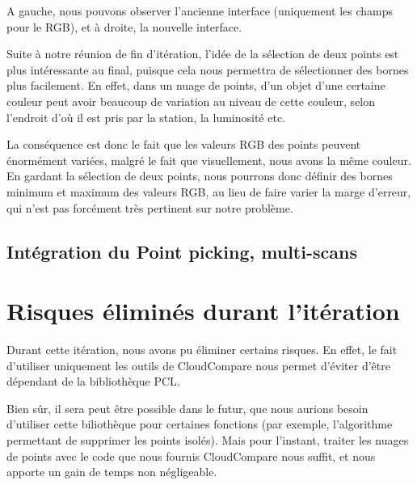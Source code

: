 \documentclass[12pt,titlepage,french]{article}
\begin{document}
A gauche, nous pouvons observer l'ancienne interface (uniquement les champs pour le RGB), et à droite, la nouvelle interface. \newline

Suite à notre réunion de fin d'itération, l'idée de la sélection de deux points est plus intéressante au final, puisque cela nous permettra de sélectionner des bornes plus facilement. En effet, dans un nuage de points, d'un objet d'une certaine couleur peut avoir beaucoup de variation au niveau de cette couleur, selon l'endroit d'où il est pris par la station, la luminosité etc. \newline

La conséquence est donc le fait que les valeurs RGB des points peuvent énormément variées, malgré le fait que visuellement, nous avons la même couleur. En gardant la sélection de deux points, nous pourrons donc définir des bornes minimum et maximum des valeurs RGB, au lieu de faire varier la marge d'erreur, qui n'est pas forcément très pertinent sur notre problème.


\subsection{Intégration du Point picking, multi-scans}



\section{Risques éliminés durant l'itération}
Durant cette itération, nous avons pu éliminer certains risques. En effet, le fait d'utiliser uniquement les outils de CloudCompare nous permet d'éviter d'être dépendant de la bibliothèque PCL. \newline

Bien sûr, il sera peut être possible dans le futur, que nous aurions besoin d'utiliser cette biliothèque pour certaines fonctions (par exemple, l'algorithme permettant de supprimer les points isolés). Mais pour l'instant, traiter les nuages de points avec le code que nous fournis CloudCompare nous suffit, et nous apporte un gain de temps non négligeable. \newline
\end{document}
